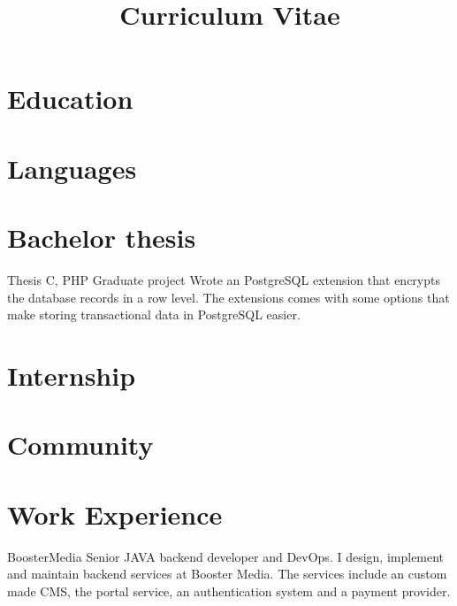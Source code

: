 \documentclass[11pt,a4paper]{moderncv}
\title{Curriculum Vitae}
\begin{document}
\maketitle

\section{Education}

\section{Languages}

\section{Bachelor thesis}
{Thesis}
{C, PHP}
{Graduate project}{}
{
Wrote an PostgreSQL extension that encrypts the database records in a row
level. The extensions comes with some options that make storing transactional
data in PostgreSQL easier.
}

\section{Internship}

\section{Community}

\section{Work Experience}

\vspace*{0.2\baselineskip}
{BoosterMedia}
{}
{}
{}
{
Senior JAVA backend developer and DevOps.
I design, implement and maintain backend services at Booster Media.
The services include an custom made CMS, the portal service,
an authentication system and a payment provider.
}
\end{document}
